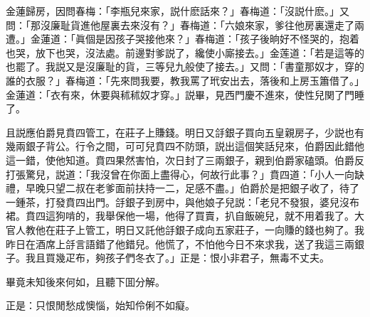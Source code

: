 金蓮歸房，因問春梅：「李瓶兒來家，説什麽話來？」春梅道：「沒説什麽。」又問：「那沒廉耻貨進他屋裏去來沒有？」春梅道：「六娘來家，爹往他房裏還走了兩遭。」金蓮道：「眞個是因孩子哭接他來？」春梅道：「孩子後晌好不怪哭的，抱着也哭，放下也哭，沒法處。前邊對爹説了，纔使小廝接去。」金莲道：「若是這等的也罷了。我説又是沒廉耻的貨，三等兒九般使了接去。」又問：「書童那奴才，穿的誰的衣服？」春梅道：「先來問我要，教我罵了玳安出去，落後和上房玉簫借了。」金蓮道：「衣有來，休要與秫秫奴才穿。」説畢，見西門慶不進來，使性兒関了門睡了。

且説應伯爵見賁四管工，在莊子上賺錢。明日又㧱銀子買向五皇親房子，少説也有幾兩銀子背公。行令之間，可可兒賁四不防頭，説出這個笑話兒來，伯爵因此錯他這一錯，使他知道。賁四果然害怕，次日封了三兩銀子，親到伯爵家磕頭。伯爵反打張驚兒，説道：「我沒曾在你面上盡得心，何故行此事？」賁四道：「小人一向缺禮，早晚只望二叔在老爹面前扶持一二，足感不盡。」伯爵於是把銀子收了，待了一鍾茶，打發賁四出門。㧱銀子到房中，與他娘子兒説：「老兒不發狠，婆兒沒布裙。賁四這狗啃的，我舉保他一場，他得了買賣，扒自飯碗兒，就不用着我了。大官人教他在莊子上管工，明日又託他㧱銀子成向五家莊子，一向賺的錢也夠了。我昨日在酒席上㧱言語錯了他錯兒。他慌了，不怕他今日不來求我，送了我這三兩銀子。我且買幾疋布，夠孩子們冬衣了。」正是：恨小非君子，無毒不丈夫。

畢竟未知後來何如，且聽下囬分解。

正是：只恨閒愁成懊惱，始知伶俐不如癡。

